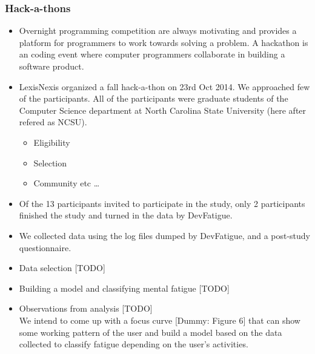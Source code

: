 \documentclass{acm_proc_article-sp}
\begin{document}
\subsubsection{Hack-a-thons}
\begin{itemize}
  \item Overnight programming competition are always motivating and provides a
  platform for programmers to work towards solving a problem. A hackathon is an
  coding event where computer programmers collaborate in building a software
  product.
  \item LexisNexis organized a fall hack-a-thon on 23rd Oct 2014. We approached
  few of the participants. All of the participants were graduate students of
  the Computer Science department at North Carolina State University (here
  after refered as NCSU).
  \begin{itemize}
  	\item Eligibility
  	\item Selection
  	\item Community etc \ldots
  \end{itemize}
  \item Of the 13 participants invited to participate in the study, only 2
  participants finished the study and turned in the data by
  DevFatigue.
  \item We collected data using the log files dumped by DevFatigue, and a
  post-study questionnaire.
  \item Data selection [TODO]
  \item Building a model and classifying mental fatigue [TODO]
  \item Observations from analysis [TODO] \\
  We intend to come up with a focus curve [Dummy: Figure 6] that can show some
  working pattern of the user and build a model based on the data collected to classify fatigue
  depending on the user's activities.
\end{itemize}
\end{document}
